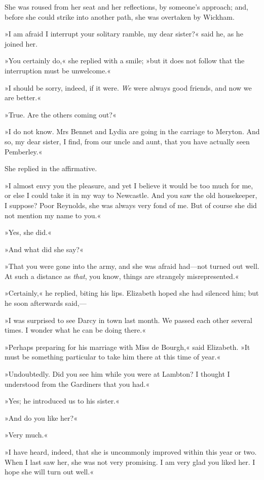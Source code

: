 She was roused from her seat and her reflections, by someone's approach; and, before she could strike into another path, she was overtaken by Wickham.

»I am afraid I interrupt your solitary ramble, my dear sister?« said he, as he joined her.

»You certainly do,« she replied with a smile; »but it does not follow that the interruption must be unwelcome.«

»I should be sorry, indeed, if it were. \textit{We} were always good friends, and now we are better.«

»True. Are the others coming out?«

»I do not know. Mrs Bennet and Lydia are going in the carriage to Meryton. And so, my dear sister, I find, from our uncle and aunt, that you have actually seen Pemberley.«

She replied in the affirmative.

»I almost envy you the pleasure, and yet I believe it would be too much for me, or else I could take it in my way to Newcastle. And you saw the old housekeeper, I suppose? Poor Reynolds, she was always very fond of me. But of course she did not mention my name to you.«

»Yes, she did.«

»And what did she say?«

»That you were gone into the army, and she was afraid had—not turned out well. At such a distance as \textit{that}, you know, things are strangely misrepresented.«

»Certainly,« he replied, biting his lips. Elizabeth hoped she had silenced him; but he soon afterwards said,—

»I was surprised to see Darcy in town last month. We passed each other several times. I wonder what he can be doing there.«

»Perhaps preparing for his marriage with Miss de Bourgh,« said Elizabeth. »It must be something particular to take him there at this time of year.«

»Undoubtedly. Did you see him while you were at Lambton? I thought I understood from the Gardiners that you had.«

»Yes; he introduced us to his sister.«

»And do you like her?«

»Very much.«

»I have heard, indeed, that she is uncommonly improved within this year or two. When I last saw her, she was not very promising. I am very glad you liked her. I hope she will turn out well.«

